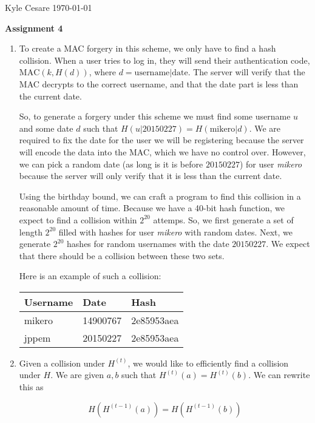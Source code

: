\documentclass[12pt,letterpaper]{article}
\begin{document}
Kyle Cesare \hfill
\today \hfill

{\center\textbf{Assignment 4} \\}

\begin{enumerate}
  \item To create a MAC forgery in this scheme, we only have to find a hash
    collision. When a user tries to log in, they will send their authentication
    code, $\text{MAC}(k, H(d))$, where $d = \text{username|date}$. The
    server will verify that the MAC decrypts to the correct username, and that
    the date part is less than the current date.

    So, to generate a forgery under this scheme we must find some username $u$
    and some date $d$ such that $H(u\text{|}20150227) = H(\text{mikero|}d)$. We
    are required to fix the date for the user we will be registering because the
    server will encode the data into the MAC, which we have no control over.
    However, we can pick a random date (as long is it is before $20150227$) for
    user \textit{mikero} because the server will only verify that it is less
    than the current date.

    Using the birthday bound, we can craft a program to find this collision in a
    reasonable amount of time. Because we have a 40-bit hash function, we expect
    to find a collision within $2^{20}$ attemps. So, we first generate a set of
    length $2^{20}$ filled with hashes for user \textit{mikero} with random
    dates. Next, we generate $2^{20}$ hashes for random usernames with the date
    $20150227$. We expect that there should be a collision between these two
    sets.

    Here is an example of such a collision:

    \begin{tabular}{ l  l  l  }
      Username & Date     & Hash \\ \hline
      mikero   & 14900767 & 2e85953aea \\
      jppem    & 20150227 & 2e85953aea \\
    \end{tabular}
    
  \item Given a collision under $H^{(t)}$, we would like to efficiently find a
    collision under $H$. We are given $a, b$ such that $H^{(t)}(a) =
    H^{(t)}(b)$. We can rewrite this as

    $$
      H(H^{(t-1)}(a)) = H(H^{(t-1)}(b))
    $$


\end{enumerate}
\end{document}
